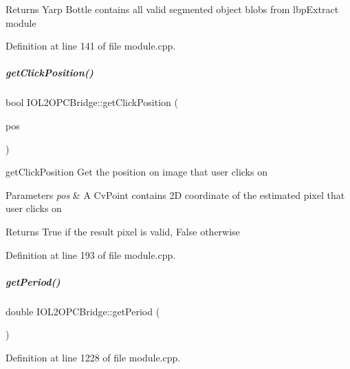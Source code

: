 \begin{DoxyReturn}{Returns}
Yarp Bottle contains all valid segmented object blobs from lbp\+Extract module 
\end{DoxyReturn}


Definition at line 141 of file module.\+cpp.

\mbox{\label{group__iol2opc_aa0b5940b736070309d86fdaef957b2b9}} 
\subparagraph{\texorpdfstring{get\+Click\+Position()}{getClickPosition()}}
{\footnotesize\ttfamily bool I\+O\+L2\+O\+P\+C\+Bridge\+::get\+Click\+Position (\begin{DoxyParamCaption}\item[{Cv\+Point \&}]{pos }\end{DoxyParamCaption})\hspace{0.3cm}{\ttfamily [protected]}}



get\+Click\+Position Get the position on image that user clicks on 


\begin{DoxyParams}{Parameters}
{\em pos} & A Cv\+Point contains 2D coordinate of the estimated pixel that user clicks on \\
\hline
\end{DoxyParams}
\begin{DoxyReturn}{Returns}
True if the result pixel is valid, False otherwise 
\end{DoxyReturn}


Definition at line 193 of file module.\+cpp.

\mbox{\label{group__iol2opc_a0b50085b3c3a57fde55d2241bc1bdee8}} 
\subparagraph{\texorpdfstring{get\+Period()}{getPeriod()}}
{\footnotesize\ttfamily double I\+O\+L2\+O\+P\+C\+Bridge\+::get\+Period (\begin{DoxyParamCaption}{ }\end{DoxyParamCaption})\hspace{0.3cm}{\ttfamily [protected]}}



Definition at line 1228 of file module.\+cpp.


